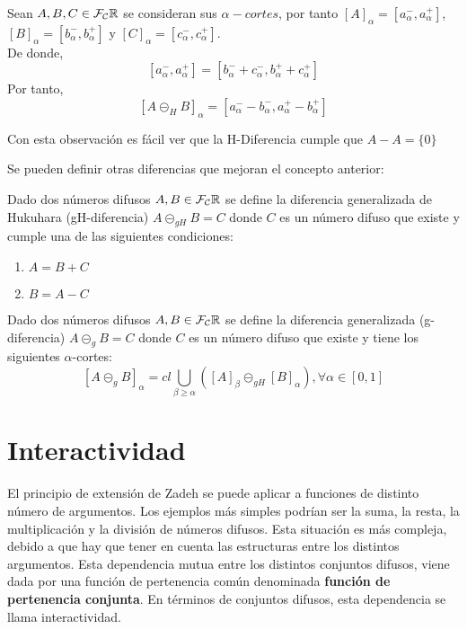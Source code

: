   \begin{observacion}
    Sean $A, B, C \in \mathcal{F}_\mathcal{C}\mathbb R$ se consideran sus $\alpha - cortes$, por tanto $[A]_\alpha = [a^-_\alpha, a^+_\alpha]$, $[B]_\alpha = [b^-_\alpha, b^+_\alpha]$ y $[C]_\alpha = [c^-_\alpha, c^+_\alpha]$. \\
    De donde,
    $$
    [a^-_\alpha, a^+_\alpha] = [b^-_\alpha + c^-_\alpha, b^+_\alpha + c^+_\alpha]
    $$
    Por tanto, 
    $$
    [A \circleddash_H B]_\alpha = [a_\alpha^- - b_\alpha^-, a_\alpha^+ - b_\alpha^+]
    $$
  \end{observacion}
  Con esta observación es fácil ver que la H-Diferencia cumple que $A-A=\{0\}$
 
  Se pueden definir otras diferencias que mejoran el concepto anterior:
  
  \begin{definicion}
  	Dado dos números difusos $A, B \in \mathcal{F}_\mathcal{C}\mathbb R$ se define la diferencia generalizada de Hukuhara (gH-diferencia) $A\circleddash_{gH}B=C$ donde $C$ es un número difuso que existe y cumple una de las siguientes condiciones:
  	
  	\begin{enumerate}
  		\item $A=B+C$ 
  		\item $B=A-C$
  	\end{enumerate}
  \end{definicion}

  \begin{definicion}
	Dado dos números difusos $A, B \in \mathcal{F}_\mathcal{C}\mathbb R$ se define la diferencia generalizada (g-diferencia) $A\circleddash_{g}B=C$ donde $C$ es un número difuso que existe y tiene los siguientes $\alpha$-cortes:
	\[
		[A \circleddash_{g} B]_\alpha = cl \bigcup_{\beta \geq \alpha} ([A]_\beta \circleddash_{gH} [B]_\alpha), \forall \alpha \in [0, 1]
	\]
  \end{definicion}

  \section{Interactividad}
  El principio de extensión de Zadeh se puede aplicar a funciones de distinto número de argumentos. Los ejemplos más simples podrían ser la suma, la resta, la multiplicación y la división de números difusos. Esta situación es más compleja, debido a que hay que tener en cuenta las estructuras entre los distintos argumentos. Esta dependencia mutua entre los distintos conjuntos difusos, viene dada por una función de pertenencia común denominada \textbf{función de pertenencia conjunta}. En términos de conjuntos difusos, esta dependencia se llama interactividad.

